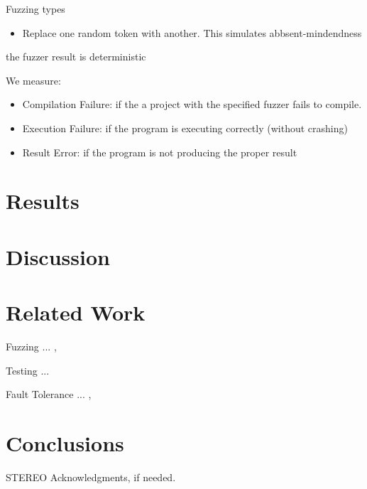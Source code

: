 \documentclass[10pt]{sigplanconf}
\begin{document}
Fuzzing types
\begin{itemize}
\item Replace one random token with another.
This simulates abbsent-mindendness 
\end{itemize}
the fuzzer result is deterministic

We measure:

\begin{itemize}
	\item Compilation Failure: if the a project with the specified fuzzer fails to compile.
	\item Execution Failure: if the program is executing correctly (without crashing)
	\item Result Error: if the program is not producing the proper result
\end{itemize}

\section{Results} %

\section{Discussion} %

\section{Related Work} %

Fuzzing ... \cite{TJC08}, \cite{WWGZ11}

Testing ... \cite{HAM06}

Fault Tolerance ... \cite{KOKR07}, \cite{LYU95}

\section{Conclusions} %

\acks

STEREO
Acknowledgments, if needed.








\end{document}
